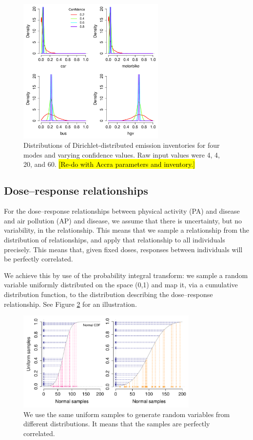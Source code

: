 \documentclass{article}
\begin{document}
\begin{figure}[h]
\centering
\includegraphics[width=0.65\textwidth]{emission_dist.pdf}
\caption{\small Distributions of Dirichlet-distributed emission inventories for four modes and varying confidence values. Raw input values were 4, 4, 20, and 60. \hl{[Re-do with Accra parameters and inventory.]}}
\label{emission_dist}
\end{figure}

\subsection{Dose--response relationships}\label{dr}

For the dose--response relationships between physical activity (PA) and disease and air pollution (AP) and disease, we assume that there is uncertainty, but no variability, in the relationship. This means that we sample a relationship from the distribution of relationships, and apply that relationship to all individuals precisely. This means that, given fixed doses, responses between individuals will be perfectly correlated.

We achieve this by use of the probability integral transform: we sample a random variable uniformly distributed on the space (0,1) and map it, via a cumulative distribution function, to the distribution describing the dose--response relationship. See Figure \ref{cdf} for an illustration.

\begin{figure}[h]
\includegraphics[width=0.8\textwidth]{DR_transform.pdf}
\caption{\small We use the same uniform samples to generate random variables from different distributions. It means that the samples are perfectly correlated.}
\label{cdf}
\end{figure}
\end{document}
